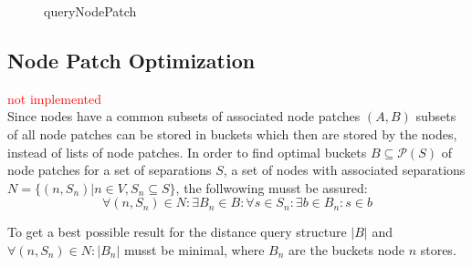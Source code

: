 \documentclass{article}
\begin{document}
\begin{figure}[ht!]
  \begin{algorithm}[H]



    \caption{queryNodePatch}
    \label{alg:queryNodePatch}
  \end{algorithm}
\end{figure}

\subsection{Node Patch Optimization}
\textcolor{red}{not implemented\\}
Since nodes have a common subsets of associated node patches $(A, B)$ subsets of all node patches can be stored in buckets which then are stored by the nodes, instead of lists of node patches.
In order to find optimal buckets $B \subseteq \mathcal{P}(S)$ of node patches for a set of separations $S$,
a set of nodes with associated separations ${N = \{(n, S_n)| n \in V, S_n \subseteq S\}}$, the follwowing musst be assured:
\begin{equation*}
  \forall (n, S_n) \in N: \exists B_n \in B: \forall s \in S_n: \exists b \in B_n: s \in b
\end{equation*}

To get a best possible result for the distance query structure $|B|$ and \linebreak
${\forall (n, S_n) \in N: |B_n|}$ musst be minimal, where $B_n$ are the buckets node $n$ stores.
\end{document}
